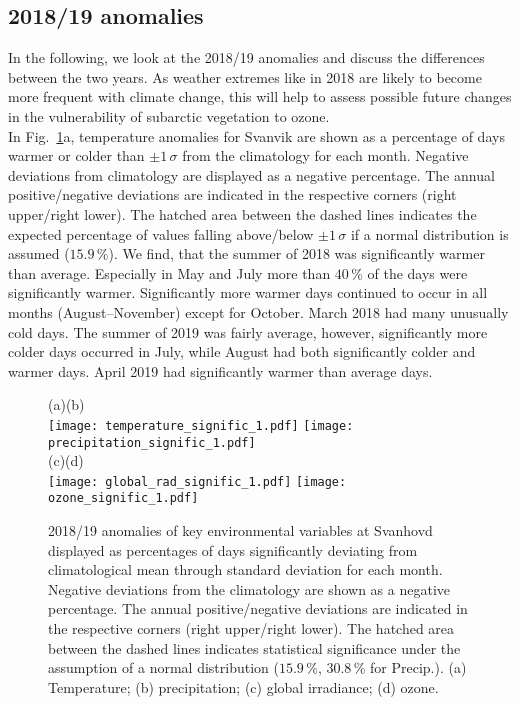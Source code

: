 \documentclass[bg, manuscript]{copernicus}
\begin{document}
\subsection{2018/19 anomalies}
\label{subsec:anomalies}
In the following, we look at the 2018/19 anomalies and discuss the differences between the two years. As weather extremes like in 2018 are likely to become more frequent with climate change, this will help to assess possible future changes in the vulnerability of subarctic vegetation to ozone.\\ 

In Fig.~\ref{fig:anomalies_svanvik}a, temperature anomalies for Svanvik are shown as a percentage of days warmer or colder than $\pm 1\,\sigma$ from the climatology for each month. Negative deviations from climatology are displayed as a negative percentage. The annual positive/negative deviations are indicated in the respective corners (right upper/right lower). The hatched area between the dashed lines indicates the expected percentage of values falling above/below $\pm 1\,\sigma$ if a normal distribution is assumed ($15.9\,\unit{\%}$). We find, that the summer of 2018 was significantly warmer than average. Especially in May and July more than $40\,\unit{\%}$ of the days were significantly warmer. Significantly more warmer days continued to occur in all months (August--November) except for October. March 2018 had many unusually cold days. The summer of 2019 was fairly average, however, significantly more colder days occurred in July, while August had both significantly colder and warmer days. April 2019 had significantly warmer than average days.

\begin{figure}[t]
  \centering
  (a)\hspace{8.3cm}(b)\\
  \texttt{[image: temperature\_signific\_1.pdf]}
  \texttt{[image: precipitation\_signific\_1.pdf]}\\
  (c)\hspace{8.3cm}(d)\\
  \texttt{[image: global\_rad\_signific\_1.pdf]}
  \texttt{[image: ozone\_signific\_1.pdf]}
  \caption{2018/19 anomalies of key environmental variables at Svanhovd displayed as percentages of days significantly deviating from climatological mean through standard deviation for each month. Negative deviations from the climatology are shown as a negative percentage. The annual positive/negative deviations are indicated in the respective corners (right upper/right lower). The hatched area between the dashed lines indicates statistical significance under the assumption of a normal distribution ($15.9\,\unit{\%}$, $30.8\,\unit{\%}$ for Precip.). (a) Temperature; (b) precipitation; (c) global irradiance; (d) ozone.}
  \label{fig:anomalies_svanvik}
\end{figure}
\end{document}

